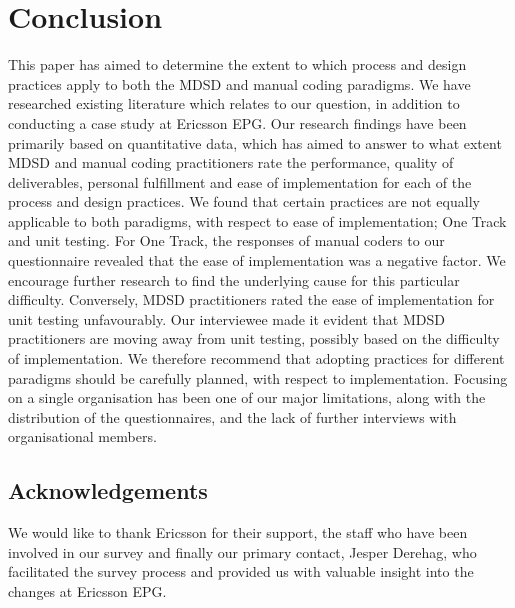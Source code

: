 \documentclass[fina_report_innit.tex]{subfiles}
\begin{document}
\section{Conclusion}
This paper has aimed to determine the extent to which process and design practices apply to both the MDSD and manual coding paradigms. We have researched existing literature which relates to our question, in addition to conducting a case study at Ericsson EPG. Our research findings have been primarily based on quantitative data, which has aimed to answer to what extent MDSD and manual coding practitioners rate the performance, quality of deliverables, personal fulfillment and ease of implementation for each of the process and design practices. We found that certain practices are not equally applicable to both paradigms, with respect to ease of implementation; One Track and unit testing. For One Track, the responses of manual coders to our questionnaire revealed that the ease of implementation was a negative factor. We encourage further research to find the underlying cause for this particular difficulty. Conversely, MDSD practitioners rated the ease of implementation for unit testing unfavourably. Our interviewee made it evident that MDSD practitioners are moving away from unit testing, possibly based on the difficulty of implementation. We therefore recommend that adopting practices for different paradigms should be carefully planned, with respect to implementation. Focusing on a single organisation has been one of our major limitations, along with the distribution of the questionnaires, and the lack of further interviews with organisational members. 


\subsection*{Acknowledgements}
We would like to thank Ericsson for their support, the staff who have been involved in our survey and finally our primary contact, Jesper Derehag, who facilitated the survey process and provided us with valuable insight into the changes at Ericsson EPG.
\end{document}
